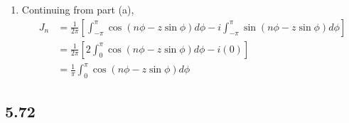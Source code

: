\documentclass[a4paper,12pt]{article}
\begin{document}
\begin{enumerate}
\begin{enumerate}
            \item
                Continuing from part (a),
                \begin{align*}
                    J_n &= \frac{1}{2\pi} \left[ \int_{-\pi}^\pi \cos(n\phi - z\sin\phi) d\phi - i \int_{-\pi}^\pi \sin(n\phi - z\sin\phi) d\phi \right] \\
                    &= \frac{1}{2\pi} \left[ 2 \int_0^\pi \cos(n\phi - z\sin\phi) d\phi - i(0) \right] \\
                    &= \frac{1}{\pi} \int_0^\pi \cos(n\phi - z\sin\phi) d\phi
                \end{align*}
        \end{enumerate}
\end{enumerate}

\subsection*{5.72}
\end{document}
